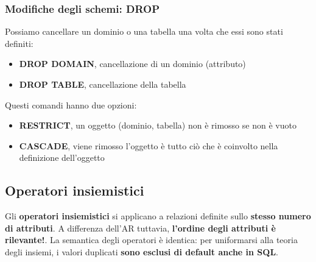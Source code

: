 \documentclass[12pt]{article}
\begin{document}
\subsubsection{Modifiche degli schemi: DROP}
Possiamo cancellare un dominio o una tabella una volta che essi sono stati definiti:
\begin{itemize}
    \item \textbf{DROP DOMAIN}, cancellazione di un dominio (attributo)
    \item \textbf{DROP TABLE}, cancellazione della tabella
\end{itemize}
Questi comandi hanno due opzioni:
\begin{itemize}
    \item \textbf{RESTRICT}, un oggetto (dominio, tabella) non è rimosso se non è vuoto
    \item \textbf{CASCADE}, viene rimosso l'oggetto è tutto ciò che è coinvolto nella definizione dell'oggetto
\end{itemize}
\subsection{Operatori insiemistici}
Gli \textbf{operatori insiemistici} si applicano a relazioni definite sullo \textbf{stesso numero di attributi}.
A differenza dell'AR tuttavia, \textbf{l'ordine degli attributi è rilevante!}.
La semantica degli operatori è identica: per uniformarsi alla teoria degli insiemi, i valori duplicati \textbf{sono esclusi di default anche in SQL}.
\end{document}
